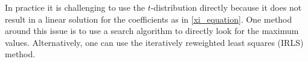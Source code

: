 \documentclass{ametsoc}
\begin{document}



\appendix[B]
\label{sec:irls}

In practice it is challenging to use the $t$-distribution directly because it does not result in a linear solution for the coefficients as in \eqref{xi_equation}. One method around this issue is to use a search algorithm to directly look for the maximum values. Alternatively, one can use the iteratively reweighted least squares (IRLS) method.
\end{document}
